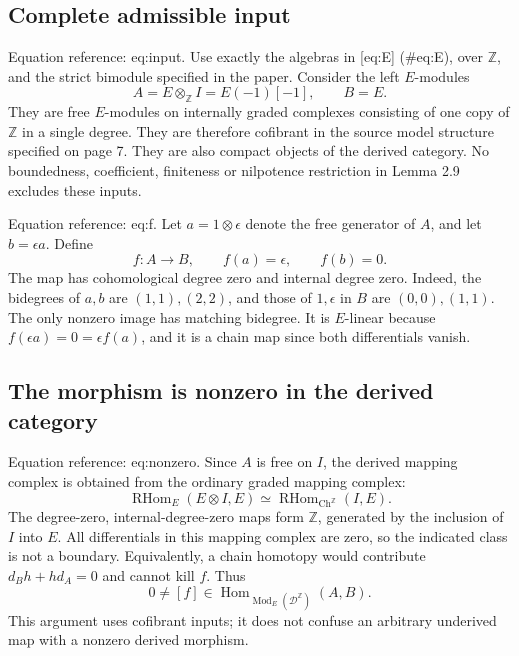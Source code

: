 \documentclass[10pt]{article}
\begin{document}
\subsection*{Complete admissible input}
Equation reference: eq:input. Use exactly the algebras in [eq:E] (\#eq:E), over \(\mathbb Z\), and the strict bimodule specified in the paper. Consider the left \(E\)-modules \[
 A=E\otimes_{\mathbb Z} I=E(-1)[-1],\qquad B=E.\] They are free \(E\)-modules on internally graded complexes consisting of one copy of \(\mathbb Z\) in a single degree. They are therefore cofibrant in the source model structure specified on page 7. They are also compact objects of the derived category. No boundedness, coefficient, finiteness or nilpotence restriction in Lemma 2.9 excludes these inputs.\par
Equation reference: eq:f. Let \(a=1\otimes\epsilon\) denote the free generator of \(A\), and let \(b=\epsilon a\). Define \[
 f:A\longrightarrow B,\qquad f(a)=\epsilon,\qquad f(b)=0.\] The map has cohomological degree zero and internal degree zero. Indeed, the bidegrees of \(a,b\) are \((1,1),(2,2)\), and those of \(1,\epsilon\) in \(B\) are \((0,0),(1,1)\). The only nonzero image has matching bidegree. It is \(E\)-linear because \(f(\epsilon a)=0=\epsilon f(a)\), and it is a chain map since both differentials vanish.\par
\subsection*{The morphism is nonzero in the derived category}
Equation reference: eq:nonzero. Since \(A\) is free on \(I\), the derived mapping complex is obtained from the ordinary graded mapping complex: \[\operatorname{RHom}_E(E\otimes I,E)\simeq \operatorname{RHom}_{\mathrm{Ch}^{\mathbb Z}}(I,E).\] The degree-zero, internal-degree-zero maps form \(\mathbb Z\), generated by the inclusion of \(I\) into \(E\). All differentials in this mapping complex are zero, so the indicated class is not a boundary. Equivalently, a chain homotopy would contribute \(d_Bh+hd_A=0\) and cannot kill \(f\). Thus \[
 0\neq[f]\in\operatorname{Hom}_{\operatorname{Mod}_E(\mathcal D^\mathbb Z)}(A,B).\] This argument uses cofibrant inputs; it does not confuse an arbitrary underived map with a nonzero derived morphism.\par
\end{document}
